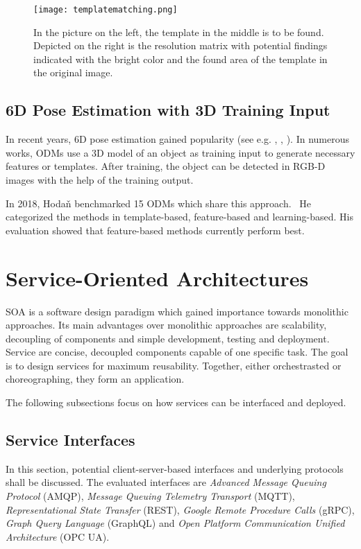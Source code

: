\begin{figure}[ht]
	\centering
  \texttt{[image: templatematching.png]}
	\caption[Template Matching]{In the picture on the left, the template in the middle is to be found. Depicted on the right is the resolution matrix with potential findings indicated with the bright color and the found area of the template in the original image.~\cite{OpenCV-Documentation2014Template2018}}
	\label{templatematching}
\end{figure}

\subsection{6D Pose Estimation with 3D Training Input}
In recent years, 6D pose estimation gained popularity (see e.g. \cite{Drost2010ModelRecognition}, \cite{Sundermeyer2018ImplicitImages}, \cite{Hinterstoisser2013ModelScenes}). In numerous works, ODMs use a 3D model of an object as training input to generate necessary features or templates. After training, the object can be detected in RGB-D images with the help of the training output. 

In 2018, Hodaň benchmarked 15 ODMs which share this approach.~\cite{Hodan2018BOP:Estimation} He categorized the methods in template-based, feature-based and learning-based. His evaluation showed that feature-based methods currently perform best.

\section{Service-Oriented Architectures}
SOA is a software design paradigm which gained importance towards monolithic approaches. Its main advantages over monolithic approaches are scalability, decoupling of components and simple development, testing and deployment. Service are concise, decoupled components capable of one specific task. The goal is to design services for maximum reusability. Together, either orchestrasted or choreographing, they form an application.

The following subsections focus on how services can be interfaced and deployed.

\subsection {Service Interfaces}
\label{serviceinterfaces}
In this section, potential client-server-based interfaces and underlying protocols shall be discussed. The evaluated interfaces are \textit{Advanced Message Queuing Protocol} (AMQP), \textit{Message Queuing Telemetry Transport} (MQTT), \textit{Representational State Transfer} (REST), \textit{Google Remote Procedure Calls} (gRPC), \textit{Graph Query Language} (GraphQL) and \textit{Open Platform Communication Unified Architecture} (OPC UA).

